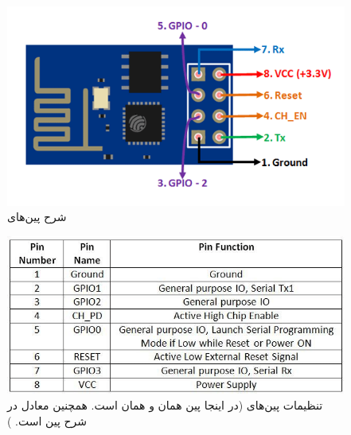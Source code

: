 \documentclass[12pt,a4paper]{article}
\begin{document}
\begin{enumerate}
		\begin{figure}[H]
			\centering
			\includegraphics[scale=0.3]{figs/ESP8266-Pinout.png}
			\caption{
				شرح پین‌های 
			}
			\label{fig:schema}
		\end{figure}
		
		\begin{figure}[H]
			\centering
			\includegraphics[scale=0.4]{figs/ESP-01-pin-configuration-The-RESET-and-VCC-pins-of-the-module-are-connected-to-the-33-V.png}
			\caption{
				تنظیمات پین‌های  (در اینجا پین  همان  و  همان  است. همچنین  معادل  در شرح پین است. )
			}
			\label{fig:schema}
		\end{figure}	
		
	\end{enumerate}
	
\end{document}
